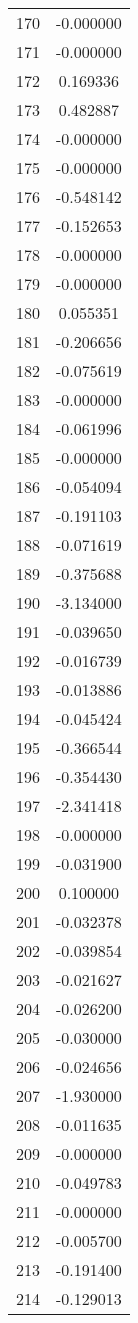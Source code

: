 \documentclass[12pt]{article}
\begin{document}
\begin{longtable}{@{}cc@{}}
170 & -0.000000 \\
171 & -0.000000 \\
172 & 0.169336 \\
173 & 0.482887 \\
174 & -0.000000 \\
175 & -0.000000 \\
176 & -0.548142 \\
177 & -0.152653 \\
178 & -0.000000 \\
179 & -0.000000 \\
180 & 0.055351 \\
181 & -0.206656 \\
182 & -0.075619 \\
183 & -0.000000 \\
184 & -0.061996 \\
185 & -0.000000 \\
186 & -0.054094 \\
187 & -0.191103 \\
188 & -0.071619 \\
189 & -0.375688 \\
190 & -3.134000 \\
191 & -0.039650 \\
192 & -0.016739 \\
193 & -0.013886 \\
194 & -0.045424 \\
195 & -0.366544 \\
196 & -0.354430 \\
197 & -2.341418 \\
198 & -0.000000 \\
199 & -0.031900 \\
200 & 0.100000 \\
201 & -0.032378 \\
202 & -0.039854 \\
203 & -0.021627 \\
204 & -0.026200 \\
205 & -0.030000 \\
206 & -0.024656 \\
207 & -1.930000 \\
208 & -0.011635 \\
209 & -0.000000 \\
210 & -0.049783 \\
211 & -0.000000 \\
212 & -0.005700 \\
213 & -0.191400 \\
214 & -0.129013 \\

\end{longtable}
\end{document}

